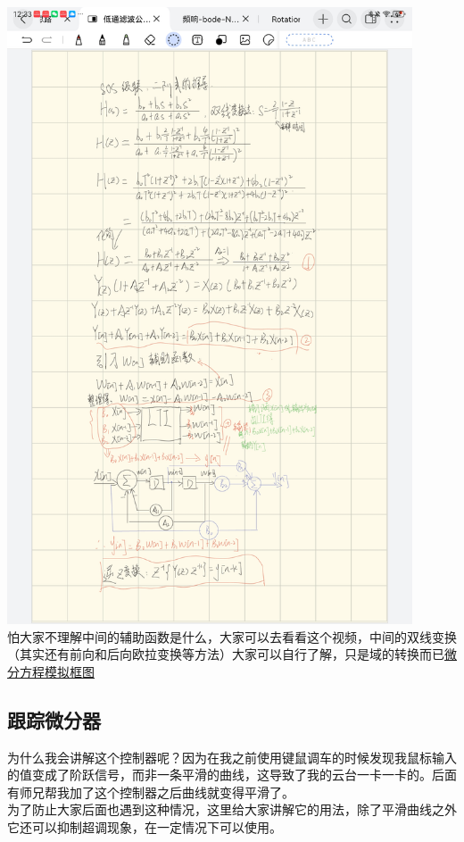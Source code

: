 \documentclass[UTF8,a4paper,12pt]{ctexart}
\begin{document}
        \par \includegraphics[width=12cm]{picture/SOS_derivation.png}
        \\怕大家不理解中间的辅助函数是什么，大家可以去看看这个视频，中间的双线变换（其实还有前向和后向欧拉变换等方法）大家可以自行了解，只是域的转换而已\href{https://www.bilibili.com/video/BV1PZ4y1t7DA?spm_id_from=333.788.videopod.episodes&vd_source=b02f21f21dd17ebeef8dac9338c9d06c&p=36}{微分方程模拟框图}
       
       \subsection{跟踪微分器}
        \begin{flushleft}
          为什么我会讲解这个控制器呢？因为在我之前使用键鼠调车的时候发现我鼠标输入的值变成了阶跃信号，而非一条平滑的曲线，这导致了我的云台一卡一卡的。后面有师兄帮我加了这个控制器之后曲线就变得平滑了。
          \\为了防止大家后面也遇到这种情况，这里给大家讲解它的用法，除了平滑曲线之外它还可以抑制超调现象，在一定情况下可以使用。
        \end{flushleft}
\end{document}
